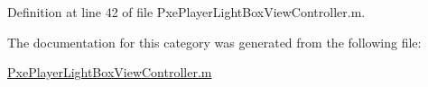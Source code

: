 Definition at line 42 of file Pxe\-Player\-Light\-Box\-View\-Controller.\-m.



The documentation for this category was generated from the following file\-:\begin{DoxyCompactItemize}
\item 
\hyperlink{_pxe_player_light_box_view_controller_8m}{Pxe\-Player\-Light\-Box\-View\-Controller.\-m}\end{DoxyCompactItemize}
